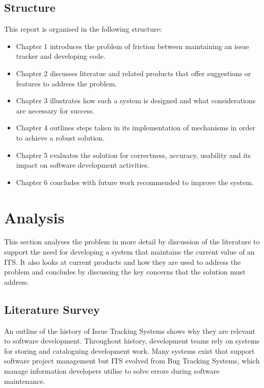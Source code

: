 \documentclass{mproj}
\begin{document}
\section{Structure}

This report is organised in the following structure:
\begin{itemize}
  \item Chapter 1 introduces the problem of friction between maintaining an issue tracker and developing code.
  \item Chapter 2 discusses literatue and related products that offer suggestions or features to address the problem.
  \item Chapter 3 illustrates how such a system is designed and what considerations are necessary for success.
  \item Chapter 4 outlines steps taken in its implementation of mechanisms in order to achieve a robust solution.
  \item Chapter 5 evaluates the solution for correctness, accuracy, usability and its impact on software development activities.
  \item Chapter 6 concludes with future work recommended to improve the system.
\end{itemize}


\chapter{Analysis}\label{analysis}

This section analyses the problem in more detail by discussion of the literature to support the need for developing a system that maintains the current value of an ITS. It also looks at current products and how they are used to address the problem and concludes by discussing the key concerns that the solution must address.


\section{Literature Survey}  

An outline of the history of Issue Tracking Systems shows why they are relevant to software development. Throughout history, development teams rely on systems for storing and cataloguing development work. Many systems exist that support software project management but ITS evolved from Bug Tracking Systems, which manage information developers utilise to solve errors during software maintenance.
\end{document}
